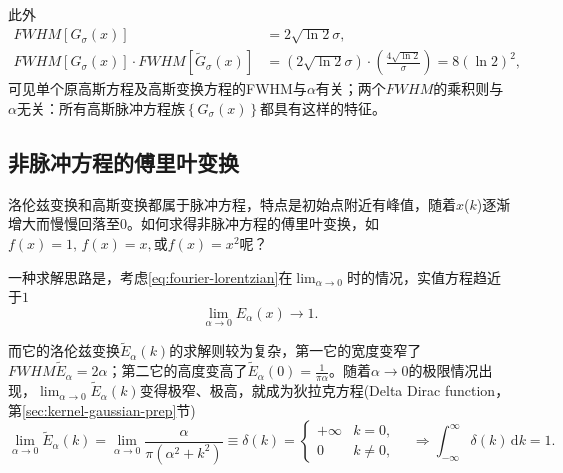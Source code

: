 此外
\begin{equation}
    \label{eq:fourier-gaussian-fwhm-product}
  \begin{split}
    FWHM \left[ G_{\sigma} \left( x \right) \right]
    & = 2 \sqrt{ \ln 2} \sigma, \\
    FWHM \left[ G_{\sigma} \left( x \right) \right] \cdot FWHM \left[ \widetilde{G}_{\sigma} \left( x \right) \right]
    & = \left( 2 \sqrt{\ln 2} \sigma \right) \cdot
    \left( \frac{4 \sqrt{\ln 2}}{\sigma}\right) = 8 \left( \ln 2\right)^{2},
  \end{split}
\end{equation}
可见单个原高斯方程及高斯变换方程的FWHM与$\alpha$有关；两个$FWHM$的乘积则与$\alpha$无关：所有高斯脉冲方程族$\left\{ G_{\sigma}(x) \right\}$都具有这样的特征。

\subsection{非脉冲方程的傅里叶变换}
\label{sec:fourier-non-pulse-functions}
洛伦兹变换和高斯变换都属于脉冲方程，特点是初始点附近有峰值，随着$x$($k$)逐渐增大而慢慢回落至$0$。如何求得非脉冲方程的傅里叶变换，如$f(x) = 1, \, f(x)=x, $或$f(x) = x^{2}$呢？

一种求解思路是，考虑\eqref{eq:fourier-lorentzian}在$\lim_{\alpha \rightarrow 0}$时的情况，实值方程趋近于$1$
\begin{equation*}
  \lim_{\alpha \rightarrow 0} E_{\alpha}(x) \rightarrow 1.
\end{equation*}

而它的洛伦兹变换$\widetilde{E}_{\alpha}(k)$的求解则较为复杂，第一它的宽度变窄了$FWHM \widetilde{E}_{\alpha} = 2 \alpha$；第二它的高度变高了$\widetilde{E}_{\alpha} \left( 0 \right) = \frac{1}{\pi \alpha}$。随着$\alpha \rightarrow 0$的极限情况出现，$\lim_{\alpha \rightarrow 0} \widetilde{E}_{\alpha}(k)$变得极窄、极高，就成为狄拉克方程(Delta Dirac function， 第\ref{sec:kernel-gaussian-prep}节) 
\begin{equation}
  \label{eq:fourier-non-pulse-dirac}
  \lim_{\alpha \rightarrow 0} \widetilde{E}_{\alpha}(k) = \lim_{\alpha \rightarrow 0} \frac{
  \alpha
  }{\pi \left( \alpha^{2} + k^{2} \right)}
  \equiv \delta (k) = \begin{cases}
  + \infty & k = 0, \\
  0 & k \neq 0,
\end{cases} \quad \Rightarrow \int_{- \infty}^{\infty} \delta (k) \, \mathrm{d} k = 1.
\end{equation}

